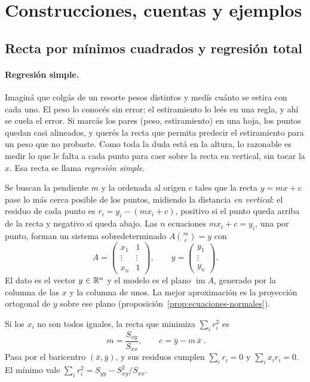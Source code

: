 \section{Construcciones, cuentas y ejemplos}

\subsection{Recta por mínimos cuadrados y regresión total}\label{sec:cuatro-problemas-regresion}

\paragraph{Regresión simple.} Imaginá que colgás de un resorte pesos distintos y medís cuánto
se estira con cada uno. El peso lo conocés sin error; el estiramiento lo leés en una regla, y
ahí se cuela el error. Si marcás los pares (peso, estiramiento) en una hoja, los puntos quedan
casi alineados, y querés la recta que permita predecir el estiramiento para un peso que no
probaste. Como toda la duda está en la altura, lo razonable es medir lo que le falta a cada
punto para caer sobre la recta en vertical, sin tocar la \(x\). Esa recta se llama
\emph{regresión simple}.

Se buscan la pendiente \(m\) y la ordenada al origen \(c\) tales que la recta \(y=mx+c\) pase
lo más cerca posible de los puntos, midiendo la distancia \emph{en vertical}: el residuo de
cada punto es \(r_i=y_i-(mx_i+c)\), positivo si el punto queda arriba de la recta y negativo
si queda abajo. Las \(n\) ecuaciones \(mx_i+c=y_i\), una por punto, forman un sistema
sobredeterminado \(A\binom{m}{c}=y\) con
\[
  A=\begin{pmatrix}x_1&1\\\vdots&\vdots\\x_n&1\end{pmatrix},\qquad
  y=\begin{pmatrix}y_1\\\vdots\\y_n\end{pmatrix}.
\]
El dato es el vector \(y\in\mathbb{R}^n\) y el modelo es el plano \(\operatorname{im}A\), generado
por la columna de las \(x\) y la columna de unos. La mejor aproximación es la proyección
ortogonal de \(y\) sobre ese plano (proposición~\ref{prop:ecuaciones-normales}).

\begin{proposicion}\label{prop:cp-recta-simple}
Si los \(x_i\) no son todos iguales, la recta que minimiza \(\sum_ir_i^2\) es
\[
  \boxed{\ m=\frac{S_{xy}}{S_{xx}},\qquad c=\bar y-m\,\bar x\ } .
\]
Pasa por el baricentro \((\bar x,\bar y)\), y sus residuos cumplen \(\sum_ir_i=0\) y
\(\sum_ix_ir_i=0\). El mínimo vale \(\sum_ir_i^2=S_{yy}-S_{xy}^2/S_{xx}\).
\end{proposicion}


